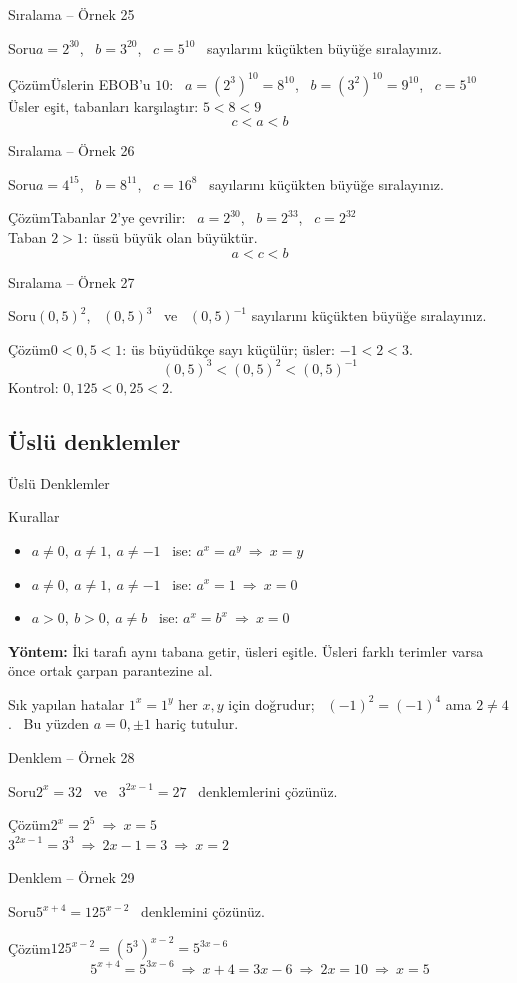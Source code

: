 \documentclass[aspectratio=169,11pt]{beamer}
\newcommand{\soru}[3]{%
\begin{frame}{#1}
  \begin{block}{Soru}\large #2\end{block}
  \pause
  \begin{exampleblock}{Çözüm}\large #3\end{exampleblock}
\end{frame}}
\begin{document}
\soru{Sıralama -- Örnek 25}
{\(a=2^{30}\), \ \(b=3^{20}\), \ \(c=5^{10}\) \ sayılarını küçükten büyüğe sıralayınız.}
{Üslerin EBOB'u \(10\): \ \(a=(2^3)^{10}=8^{10}\), \ \(b=(3^2)^{10}=9^{10}\), \ \(c=5^{10}\)\\[4pt]
Üsler eşit, tabanları karşılaştır: \(5<8<9\)
\[c<a<b\]}

\soru{Sıralama -- Örnek 26}
{\(a=4^{15}\), \ \(b=8^{11}\), \ \(c=16^{8}\) \ sayılarını küçükten büyüğe sıralayınız.}
{Tabanlar \(2\)'ye çevrilir: \ \(a=2^{30}\), \ \(b=2^{33}\), \ \(c=2^{32}\)\\[4pt]
Taban \(2>1\): üssü büyük olan büyüktür.
\[a<c<b\]}

\soru{Sıralama -- Örnek 27}
{\((0{,}5)^{2}\), \ \((0{,}5)^{3}\) \ ve \ \((0{,}5)^{-1}\) sayılarını küçükten büyüğe sıralayınız.}
{\(0<0{,}5<1\): üs büyüdükçe sayı küçülür; üsler: \(-1<2<3\).
\[(0{,}5)^{3}<(0{,}5)^{2}<(0{,}5)^{-1}\]
Kontrol: \(0{,}125<0{,}25<2\).}

\subsection{Üslü denklemler}
\begin{frame}{Üslü Denklemler}
\begin{block}{Kurallar}
\begin{itemize}
\item \(a\neq 0,\ a\neq 1,\ a\neq -1\) \ ise: \quad \(a^x=a^y\ \Rightarrow\ x=y\)
\item \(a\neq 0,\ a\neq 1,\ a\neq -1\) \ ise: \quad \(a^x=1\ \Rightarrow\ x=0\)
\item \(a>0,\ b>0,\ a\neq b\) \ ise: \quad \(a^x=b^x\ \Rightarrow\ x=0\)
\end{itemize}
\textbf{Yöntem:} İki tarafı aynı tabana getir, üsleri eşitle. Üsleri farklı terimler varsa önce ortak çarpan parantezine al.
\end{block}
\begin{alertblock}{Sık yapılan hatalar}
\(1^x=1^y\) her \(x,y\) için doğrudur; \ \((-1)^2=(-1)^4\) ama \(2\neq 4\). \ Bu yüzden \(a=0,\pm 1\) hariç tutulur.
\end{alertblock}
\end{frame}

\soru{Denklem -- Örnek 28}
{\(2^x=32\) \ ve \ \(3^{2x-1}=27\) \ denklemlerini çözünüz.}
{\(2^x=2^5\ \Rightarrow\ x=5\)\\[4pt]
\(3^{2x-1}=3^3\ \Rightarrow\ 2x-1=3\ \Rightarrow\ x=2\)}

\soru{Denklem -- Örnek 29}
{\(5^{x+4}=125^{x-2}\) \ denklemini çözünüz.}
{\(125^{x-2}=(5^3)^{x-2}=5^{3x-6}\)
\[5^{x+4}=5^{3x-6}\ \Rightarrow\ x+4=3x-6\ \Rightarrow\ 2x=10\ \Rightarrow\ x=5\]}
\end{document}
